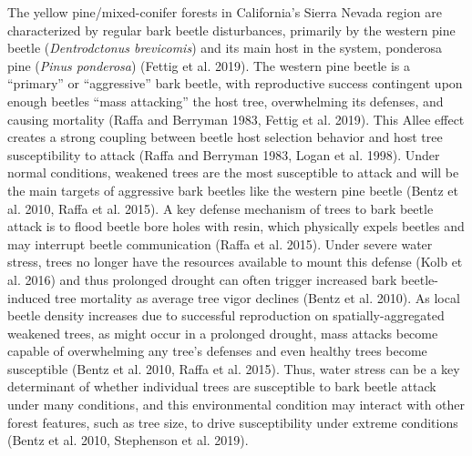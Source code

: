 \documentclass[]{article}
\begin{document}
The yellow pine/mixed-conifer forests in California's Sierra Nevada
region are characterized by regular bark beetle disturbances, primarily
by the western pine beetle (\emph{Dentrodctonus brevicomis}) and its
main host in the system, ponderosa pine (\emph{Pinus ponderosa}) (Fettig
et al. 2019). The western pine beetle is a ``primary'' or ``aggressive''
bark beetle, with reproductive success contingent upon enough beetles
``mass attacking'' the host tree, overwhelming its defenses, and causing
mortality (Raffa and Berryman 1983, Fettig et al. 2019). This Allee
effect creates a strong coupling between beetle host selection behavior
and host tree susceptibility to attack (Raffa and Berryman 1983, Logan
et al. 1998). Under normal conditions, weakened trees are the most
susceptible to attack and will be the main targets of aggressive bark
beetles like the western pine beetle (Bentz et al. 2010, Raffa et al.
2015). A key defense mechanism of trees to bark beetle attack is to
flood beetle bore holes with resin, which physically expels beetles and
may interrupt beetle communication (Raffa et al. 2015). Under severe
water stress, trees no longer have the resources available to mount this
defense (Kolb et al. 2016) and thus prolonged drought can often trigger
increased bark beetle-induced tree mortality as average tree vigor
declines (Bentz et al. 2010). As local beetle density increases due to
successful reproduction on spatially-aggregated weakened trees, as might
occur in a prolonged drought, mass attacks become capable of
overwhelming any tree's defenses and even healthy trees become
susceptible (Bentz et al. 2010, Raffa et al. 2015). Thus, water stress
can be a key determinant of whether individual trees are susceptible to
bark beetle attack under many conditions, and this environmental
condition may interact with other forest features, such as tree size, to
drive susceptibility under extreme conditions (Bentz et al. 2010,
Stephenson et al. 2019).
\end{document}
